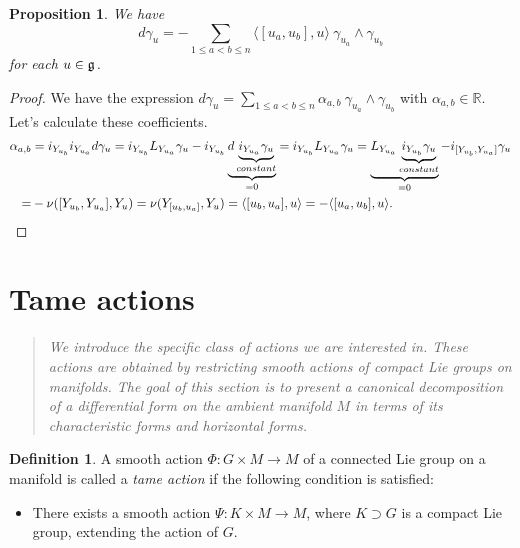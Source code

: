 \documentclass[a4paper,oneside,10pt,reqno]{amsart}
\newtheorem{proposition}[theorem]{Proposition}
\theoremstyle{definition}
\newtheorem{definition}[theorem]{Definition}
\newcommand{\g}{\noindent {\mathfrak{g}}}
\newcommand\R{\mathbb R}
\begin{document}
 
 \begin{proposition}\label{21delta}
We have
 \begin{equation}\label{dedbis}
 d \gamma_u = -
 \sum_{1\leq a <b\leq n}  \langle [u_a,u_b],u\rangle\ \gamma_{u_a} \wedge \gamma_{u_b} 
 \end{equation}
 for each $u \in \g$.
 \end{proposition}
 \begin{proof}
We have the expression
$\displaystyle
d \gamma_u = \sum_{1\leq a <b\leq n} \alpha_{a,b} \ \gamma_{u_a} \wedge \gamma_{u_b}
$
with  $ \alpha_{a,b} \in \R$.
Let's calculate these coefficients.
\begin{align*}
 \alpha_{a,b} &=  i_{Y_{u_b}}i_{Y_{u_a}} d\gamma_u  =  i_{Y_{u_b}}L_{Y_{u_a}}  \gamma_u -  
 i_{Y_{u_b}} \underbrace{d  \underbrace{i_{Y_{u_a}} \gamma_u }_{constant}}_{=0}
 =  i_{Y_{u_b}}L_{Y_{u_a}}  \gamma_u=  \underbrace{L_{Y_{u_a}}  \underbrace{ i_{Y_{u_b}}   \gamma_u}_{constant}}_{=0} -   i_{[Y_{u_b}, Y_{u_a}]}  \gamma_u
 \\ =& -\nu([Y_{u_b},Y_{u_a}],Y_u) = \nu(Y_{[u_b,{u_a}]},Y_u)
  =  \langle [u_b,{u_a}],u\rangle = -  \langle [{u_a},u_b],u\rangle.  \qedhere
\end{align*}    
 \end{proof}






\section {Tame actions}\label{tame}
\begin{quote}\emph{
We introduce the specific class of actions  we are interested in. These actions are obtained by restricting smooth actions of compact Lie groups on manifolds. The goal of this section is to present a canonical decomposition of a differential form on the ambient manifold $M$ in terms of its characteristic forms and horizontal forms.
}

\end{quote}
\begin{definition}
A smooth action $\Phi \colon G \times M\to M$ of a connected Lie group on a manifold is called a \emph{tame action} if the following condition is satisfied:

\begin{itemize}

\item[\textsf{(T)}] There exists a smooth action $\Psi \colon K \times M\to M$, where $K\supset G$ is a compact Lie group, extending the action of $G$. 
\end{itemize}
\end{definition}
\end{document}
